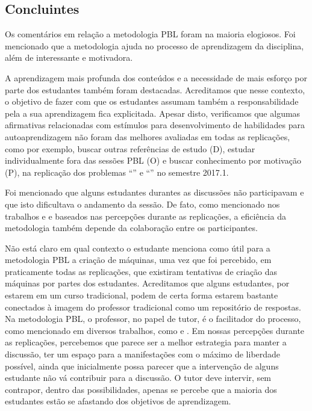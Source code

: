 \subsection{Concluintes}

Os comentários em relação a metodologia PBL foram na maioria elogiosos.
Foi mencionado que a metodologia ajuda no processo de aprendizagem da
disciplina, além de interessante e motivadora.

A aprendizagem mais profunda dos conteúdos e a necessidade de mais
esforço por parte dos estudantes também foram destacadas.
Acreditamos que nesse contexto, o objetivo de fazer com que
os estudantes assumam também a responsabilidade pela a
sua aprendizagem fica explicitada.
Apesar disto, verificamos que algumas afirmativas relacionadas
com estímulos para desenvolvimento de habilidades para autoaprendizagem
não foram das melhores avaliadas em todas as replicações,
como por exemplo, buscar outras referências de estudo (D),
estudar individualmente fora das sessões PBL (O) e buscar
conhecimento por motivação (P), na replicação dos
problemas ``\ProblemaG'' e ``\ProblemaB'' no semestre 2017.1.

Foi mencionado que alguns estudantes durantes as discussões
não participavam e que isto dificultava o andamento da sessão.
De fato, como mencionado nos
trabalhos \cite{savery2015overview} e \cite{albanese2010problem}
e baseados nas percepções durante as replicações, a eficiência da metodologia
também depende da colaboração entre os participantes.

Não está claro em qual contexto o estudante menciona como útil
para a metodologia PBL a criação de máquinas, uma vez que
foi percebido, em praticamente todas as replicações, que
existiram tentativas de criação das máquinas por partes
dos estudantes.
Acreditamos que alguns estudantes, por estarem em um curso
tradicional, podem de certa forma estarem bastante conectados
à imagem do professor tradicional como um repositório de
respostas.
Na metodologia PBL, o professor, no papel de tutor, é o facilitador
do processo, como mencionado em diversos trabalhos, como
\cite{hmelo2004problem} e \cite{savery2015overview}.
Em nossas percepções durante as replicações, percebemos que
parece ser a melhor estrategia para manter a discussão, ter um
espaço para a manifestações com o máximo de liberdade possível,
ainda que inicialmente possa parecer que a intervenção
de alguns estudante não vá contribuir para
a discussão.
O tutor deve intervir, sem contrapor, dentro das possibilidades,
apenas se percebe que a maioria dos estudantes estão se afastando
dos objetivos de aprendizagem.

